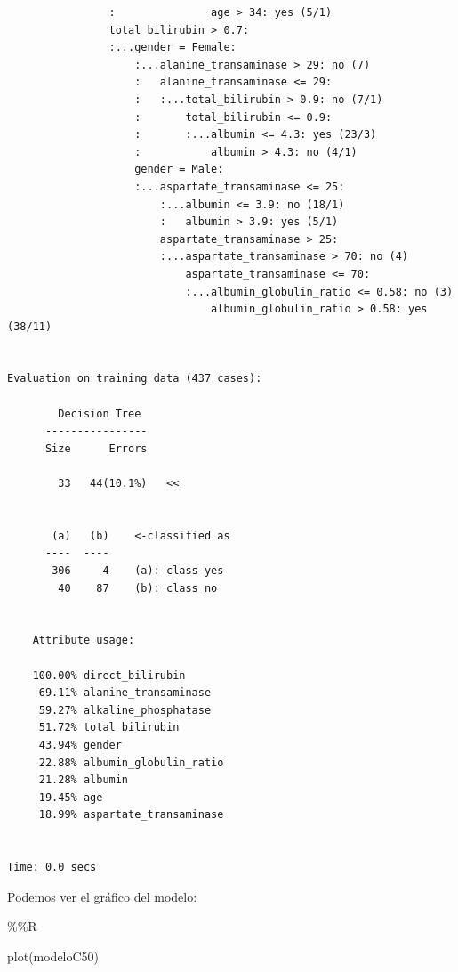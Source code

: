 \documentclass[
  11pt,
  a4paper,
]{article}
\newenvironment{Shaded}{\begin{snugshade}}{\end{snugshade}}
\newcommand{\FunctionTok}[1]{\textcolor[rgb]{0.00,0.00,0.00}{#1}}
\newcommand{\NormalTok}[1]{#1}
\newcommand{\SpecialCharTok}[1]{\textcolor[rgb]{0.00,0.00,0.00}{#1}}
\begin{document}
\begin{verbatim}
                :               age > 34: yes (5/1)
                total_bilirubin > 0.7:
                :...gender = Female:
                    :...alanine_transaminase > 29: no (7)
                    :   alanine_transaminase <= 29:
                    :   :...total_bilirubin > 0.9: no (7/1)
                    :       total_bilirubin <= 0.9:
                    :       :...albumin <= 4.3: yes (23/3)
                    :           albumin > 4.3: no (4/1)
                    gender = Male:
                    :...aspartate_transaminase <= 25:
                        :...albumin <= 3.9: no (18/1)
                        :   albumin > 3.9: yes (5/1)
                        aspartate_transaminase > 25:
                        :...aspartate_transaminase > 70: no (4)
                            aspartate_transaminase <= 70:
                            :...albumin_globulin_ratio <= 0.58: no (3)
                                albumin_globulin_ratio > 0.58: yes (38/11)


Evaluation on training data (437 cases):

        Decision Tree   
      ----------------  
      Size      Errors  

        33   44(10.1%)   <<


       (a)   (b)    <-classified as
      ----  ----
       306     4    (a): class yes
        40    87    (b): class no


    Attribute usage:

    100.00% direct_bilirubin
     69.11% alanine_transaminase
     59.27% alkaline_phosphatase
     51.72% total_bilirubin
     43.94% gender
     22.88% albumin_globulin_ratio
     21.28% albumin
     19.45% age
     18.99% aspartate_transaminase


Time: 0.0 secs
\end{verbatim}

Podemos ver el gráfico del modelo:

\begin{Shaded}
\begin{Highlighting}[]
\SpecialCharTok{\%\%}\NormalTok{R}

\FunctionTok{plot}\NormalTok{(modeloC50)}
\end{Highlighting}
\end{Shaded}
\end{document}
